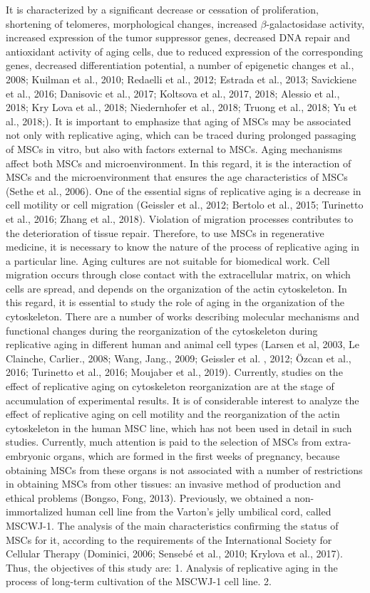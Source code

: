 \documentclass[a4paper,12pt]{article}
\begin{document}
It is characterized by a significant decrease or cessation of proliferation, shortening of telomeres, morphological changes, increased $\beta$-galactosidase activity, increased expression of the tumor suppressor genes, decreased DNA repair and antioxidant activity of aging cells, due to reduced expression of the corresponding genes, decreased differentiation potential, a number of epigenetic changes et al., 2008; Kuilman et al., 2010; Redaelli et al., 2012; Estrada et al., 2013; Savickiene et al., 2016; Danisovic et al., 2017; Koltsova et al., 2017, 2018; Alessio et al., 2018; Kry Lova et al., 2018; Niedernhofer et al., 2018; Truong et al., 2018; Yu et al., 2018;). It is important to emphasize that aging of MSCs may be associated not only with replicative aging, which can be traced during prolonged passaging of MSCs in vitro, but also with factors external to MSCs. Aging mechanisms affect both MSCs and microenvironment. In this regard, it is the interaction of MSCs and the microenvironment that ensures the age characteristics of MSCs (Sethe et al., 2006). One of the essential signs of replicative aging is a decrease in cell motility or cell migration (Geissler et al., 2012; Bertolo et al., 2015; Turinetto et al., 2016; Zhang et al., 2018). Violation of migration processes contributes to the deterioration of tissue repair. Therefore, to use MSCs in regenerative medicine, it is necessary to know the nature of the process of replicative aging in a particular line. Aging cultures are not suitable for biomedical work.
Cell migration occurs through close contact with the extracellular matrix, on which cells are spread, and depends on the organization of the actin cytoskeleton. In this regard, it is essential to study the role of aging in the organization of the cytoskeleton. There are a number of works describing molecular mechanisms and functional changes during the reorganization of the cytoskeleton during replicative aging in different human and animal cell types (Larsen et al, 2003, Le Clainche, Carlier., 2008; Wang, Jang., 2009; Geissler et al. , 2012; Özcan et al., 2016; Turinetto et al., 2016; Moujaber et al., 2019). Currently, studies on the effect of replicative aging on cytoskeleton reorganization are at the stage of accumulation of experimental results. It is of considerable interest to analyze the effect of replicative aging on cell motility and the reorganization of the actin cytoskeleton in the human MSC line, which has not been used in detail in such studies.
Currently, much attention is paid to the selection of MSCs from extra-embryonic organs, which are formed in the first weeks of pregnancy, because obtaining MSCs from these organs is not associated with a number of restrictions in obtaining MSCs from other tissues: an invasive method of production and ethical problems (Bongso, Fong, 2013). Previously, we obtained a non-immortalized human cell line from the Varton's jelly umbilical cord, called MSCWJ-1. The analysis of the main characteristics confirming the status of MSCs for it, according to the requirements of the International Society for Cellular Therapy (Dominici, 2006; Sensebé et al., 2010; Krylova et al., 2017). Thus, the objectives of this study are: 1. Analysis of replicative aging in the process of long-term cultivation of the MSCWJ-1 cell line. 2.
\end{document}
